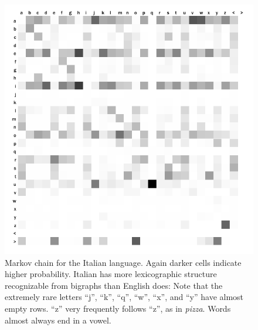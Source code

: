 \documentclass[twocolumn]{article}
\begin{document}
\begin{figure}
\includegraphics[width=\linewidth]{italiancoin1}
\caption{Markov chain for the Italian language. Again darker cells
  indicate higher probability. Italian has more lexicographic
  structure recognizable from bigraphs than English does: Note that
  the extremely rare letters ``j'', ``k'', ``q'', ``w'', ``x'', and
  ``y'' have almost empty rows. ``z'' very frequently follows ``z'',
  as in {\it pizza}. Words almost always end in a vowel.}
\label{fig:italianbigrams}
\end{figure}
\end{document}
